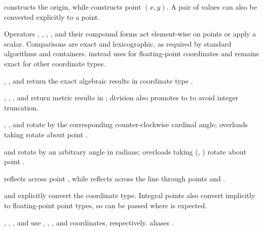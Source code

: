 \begin{compactitem}
  \item {} constructs the origin, while  constructs point $(x, y)$. A pair of values can also be converted explicitly to a point.
  \item Operators \inlinecode{+}, \inlinecode{-}, \inlinecode{*}, \inlinecode{/}, and their compound forms act element-wise on points or apply a scalar. Comparisons are exact and lexicographic, as required by standard algorithms and containers.  instead uses  for floating-point coordinates and remains exact for other coordinate types.
  \item {}, , and  return the exact algebraic results in coordinate type .
  \item {}, , , and  return metric results in ; division also promotes to  to avoid integer truncation.
  \item {}, , and  rotate by the corresponding counter-clockwise cardinal angle; overloads taking  rotate about point .
  \item {} and  rotate by an arbitrary angle  in radians; overloads taking (, ) rotate about point .
  \item {} reflects across point , while  reflects across the line through points  and .
  \item {} and  explicitly convert the coordinate type. Integral points also convert implicitly to floating-point point types, so  can be passed where  is expected.
  \item {}, , , and  use , , , and  coordinates, respectively.  aliases .
\end{compactitem}

